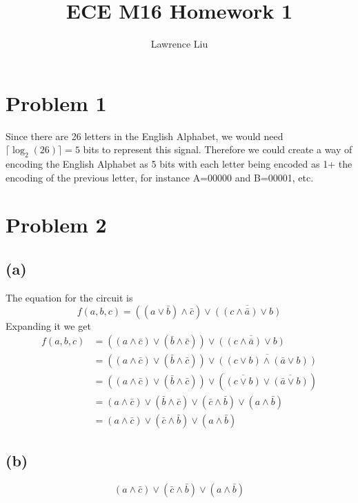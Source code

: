 \documentclass[12pt]{article}
\title{ECE M16 Homework 1}
\author{Lawrence Liu}
\begin{document}
\maketitle
\section*{Problem 1}
Since there are 26 letters in the English Alphabet, we would need $\lceil \log_2 (26)\rceil=5$ bits to represent this signal.
Therefore we could create a way of encoding the English Alphabet as 5 bits with each letter being encoded as 1+ the encoding of the previous letter, for instance 
A=00000 and B=00001, etc.
\section*{Problem 2}
\subsection*{(a)}
The equation for the circuit is 
$$f(a,b,c)=((a\vee \bar{b})\wedge\bar{c})\vee\overline{((c\wedge\bar{a})\vee b)}$$
Expanding it we get
\begin{align*}
    f(a,b,c)&=((a\wedge\bar{c})\vee (\bar{b}\wedge\bar{c}))
                \vee\overline{((c\wedge\bar{a})\vee b)}\\
    &=((a\wedge\bar{c})\vee (\bar{b}\wedge\bar{c}))
    \vee\overline{((c\vee b)\wedge(\bar{a}\vee b))}\\
    &=((a\wedge\bar{c})\vee (\bar{b}\wedge\bar{c}))
    \vee(\overline{(c\vee b)}\vee\overline{(\bar{a}\vee b)})\\
    &=(a\wedge\bar{c})\vee (\bar{b}\wedge\bar{c})
    \vee(\bar{c}\wedge \bar{b})\vee(a\wedge\bar{b})\\
    &=\boxed{(a\wedge\bar{c})
    \vee(\bar{c}\wedge \bar{b})\vee(a\wedge\bar{b})}
\end{align*}
\subsection*{(b)}
$$\boxed{(a\wedge\bar{c})
\vee(\bar{c}\wedge \bar{b})\vee(a\wedge\bar{b})}$$
\end{document}
